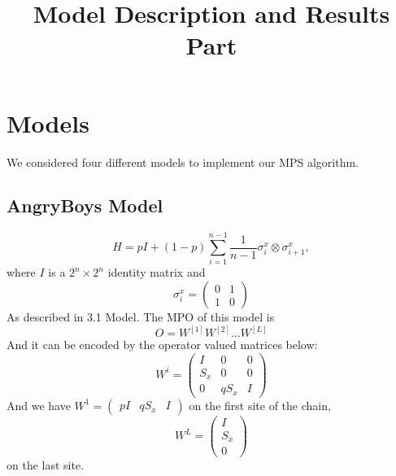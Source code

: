 \documentclass[english]{article}
\begin{document}
\title{Model Description and Results Part}
\maketitle


\section{Models}
We considered four different models to implement our MPS algorithm.
\subsection{AngryBoys Model}
\begin{displaymath}
H = pI + (1-p)\sum_{i=1}^{n-1}\frac{1}{n-1}\sigma_i^x\otimes\sigma_{i+1}^x,
\end{displaymath}
where $I$ is a $2^n\times2^n$ identity matrix and 
\begin{displaymath}
\sigma_i^x = 
\begin{pmatrix}
0 & 1 \\
1 & 0
\end{pmatrix}
\end{displaymath}
As described in 3.1 Model.
The MPO of this model is 
$$
O=W^{[1]}W^{[2]} ... W^{[L]}
$$
And it can be encoded by the operator valued matrices below:
$$
W^{i}=
\begin{pmatrix}
I & 0 & 0 \\
S_x & 0 & 0 \\
0 & qS_x & I
\end{pmatrix}
$$
And  we have $W^1=\begin{pmatrix}p I & q S_x & I\end{pmatrix}$ on the first site of the chain, 
$$W^L=\begin{pmatrix}
I \\ S_x \\ 0
\end{pmatrix}$$
on the last site.
\end{document}
